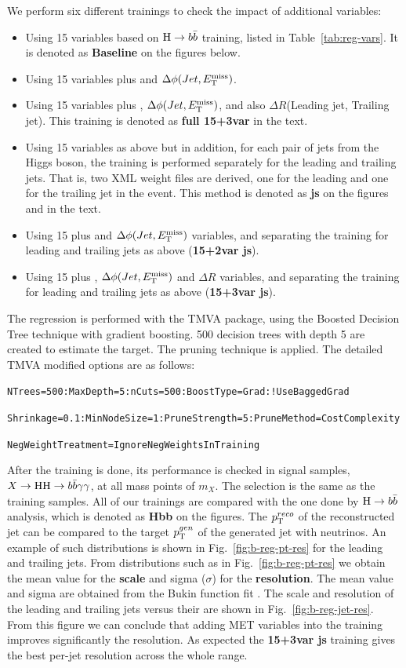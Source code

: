 We perform six different trainings to check the impact of additional variables:
\begin{itemize}
\item Using 15 variables based on $\mathrm{H}\to b\bar{b}$ training, listed in
  Table~\ref{tab:reg-vars}. It is denoted as \textbf{Baseline} on the
  figures below.
\item Using 15 variables plus \MET and $\Delta\phi(Jet, E_{\mathrm{T}}^{\text{miss}})$.
\item Using 15 variables plus \MET , $\Delta\phi(Jet, E_{\mathrm{T}}^{\text{miss}})$, and also
  $\Delta R$(Leading jet, Trailing jet).  This training is denoted as
  \textbf{full 15+3var} in the text.
\item Using 15 variables as above but in addition, for each pair of
  jets from the Higgs boson, the training is performed separately for
  the leading and trailing jets. That is, two XML weight files are
  derived, one for the leading and one for the trailing jet in the
  event.  This method is denoted as \textbf{js} on the figures and in
  the text.
\item Using 15 plus \MET and $\Delta\phi(Jet, E_{\mathrm{T}}^{\text{miss}})$ variables, and
  separating the training for leading and trailing jets as above (\textbf{15+2var js}).
\item Using 15 plus \MET, $\Delta\phi(Jet, E_{\mathrm{T}}^{\text{miss}})$ and $\Delta R$
  variables, and separating the training for leading and trailing jets
  as above (\textbf{15+3var js}).
\end{itemize}

The regression is performed with the TMVA package, using the Boosted Decision Tree technique with gradient boosting. 500 decision trees with depth 5 are created to estimate the target. 
The pruning technique is applied.
The detailed TMVA modified options are as follows:

\verb|NTrees=500:MaxDepth=5:nCuts=500:BoostType=Grad:!UseBaggedGrad|

\verb|Shrinkage=0.1:MinNodeSize=1:PruneStrength=5:PruneMethod=CostComplexity|

\verb|NegWeightTreatment=IgnoreNegWeightsInTraining|

After the training is done, its performance is checked in signal samples, $X\to\mathrm{H}\mathrm{H}\to b\bar{b}\gamma\gamma$, at all mass points of $m_X$.  
The selection is the same as the training samples. 
All of our trainings are compared with the one done by $\mathrm{H}\to b\bar{b}$ analysis, which is denoted as \textbf{Hbb} on the figures. 
The $p_{\mathrm{T}}^{reco}$ of the reconstructed jet can be compared to the target $p_{\mathrm{T}}^{gen}$ of the generated jet with neutrinos. 
An example of such distributions is shown in Fig.~\ref{fig:b-reg-pt-res} for the leading and trailing jets. 
From distributions such as in Fig.~\ref{fig:b-reg-pt-res} we obtain the mean value for the \textbf{scale} and sigma ($\sigma$) for the \textbf{resolution}. 
The mean value and sigma are obtained from the Bukin function fit \cite{bukin}. 
The scale and resolution of the leading and trailing jets versus their \PT are shown in Fig.~\ref{fig:b-reg-jet-res}. 
From this figure we can conclude that adding MET variables into the training improves significantly the resolution. 
As expected the \textbf{15+3var js} training gives the best per-jet resolution across the whole \PT range.


